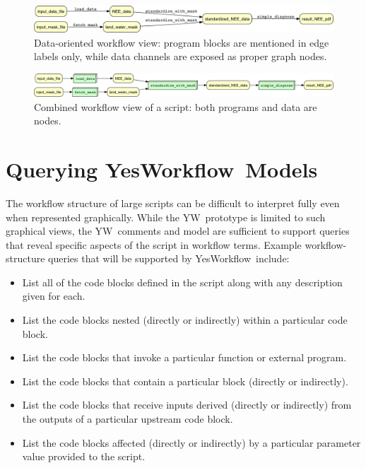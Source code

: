 \documentclass{article}
\newcommand{\YW}{\textsf{YesWorkflow}}
\newcommand{\yw}{\textsf{YW}}
\newcommand{\YWT}{\textsf{YesWorkflow}}
\begin{document}
 \begin{figure}[h]
   \centering
   \includegraphics[width=1.0\textwidth]{example_data-crop.pdf}
   \caption{Data-oriented workflow view: program blocks are mentioned
     in edge labels only, while data channels are exposed as proper
     graph nodes.}
   \label{fig-simple-data}
 \end{figure}

 \begin{figure}[h]
   \centering
   \includegraphics[width=1.0\textwidth]{example_comb-crop.pdf}
   \caption{Combined workflow view of a script: both programs and data
   are nodes.}
   \label{fig-simple-combined}
 \end{figure}



\section{Querying \YWT\ Models}\label{sec-querying}

The workflow structure of large scripts can be difficult to interpret
fully even when represented graphically.  While the \yw\
prototype is limited to such graphical views, the \yw\ comments and
model are sufficient to support queries that reveal specific aspects
of the script in workflow terms.  Example
workflow-structure queries that will be supported by \YW\ include:
%
\begin{itemize}
\item List all of the code blocks defined in the script along with any description given for each.
\item List the code blocks nested (directly or indirectly) within a particular code block.
\item List the code blocks that invoke a particular function or external program.
\item List the code blocks that contain a particular block (directly or indirectly).
\item List the code blocks that receive inputs derived (directly or indirectly) from the outputs of a particular upstream code block.
\item List the code blocks affected (directly or indirectly) by a particular parameter value provided to the script.
\end{itemize}
\end{document}
